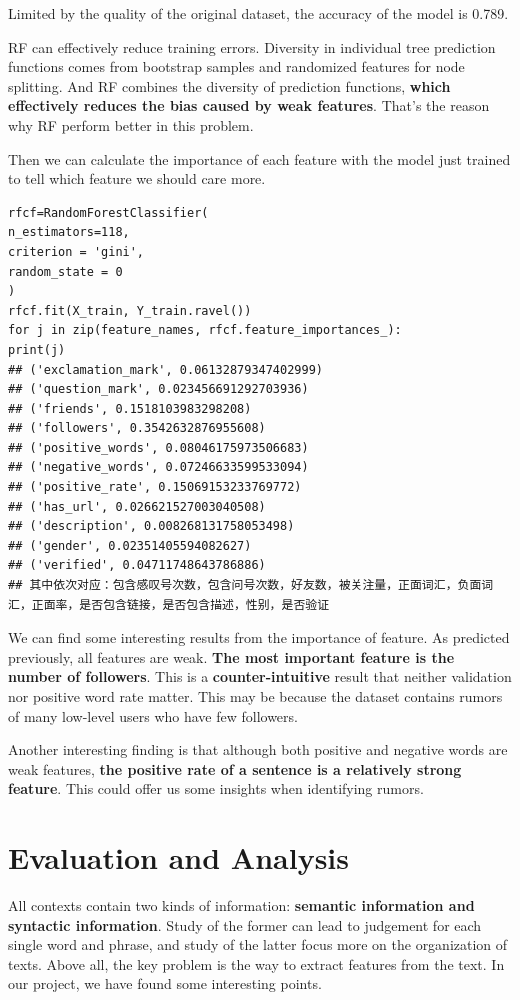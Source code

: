 \documentclass[12pt,a4paper]{article}
\begin{document}
Limited by the quality of the original dataset, the accuracy of the model is 0.789.

RF can effectively reduce training errors. Diversity in individual tree prediction functions comes from bootstrap samples and randomized features for node splitting. And RF combines the diversity of prediction functions, \textbf{which effectively reduces the bias caused by weak features}. That’s the reason why RF perform better in this problem. 

Then we can calculate the importance of each feature with the model just trained to tell which feature we should care more.

\begin{lstlisting}
rfcf=RandomForestClassifier(
n_estimators=118,
criterion = 'gini',
random_state = 0
)
rfcf.fit(X_train, Y_train.ravel())
for j in zip(feature_names, rfcf.feature_importances_):
print(j)
## ('exclamation_mark', 0.06132879347402999)
## ('question_mark', 0.023456691292703936)
## ('friends', 0.1518103983298208)
## ('followers', 0.3542632876955608)
## ('positive_words', 0.08046175973506683)
## ('negative_words', 0.07246633599533094)
## ('positive_rate', 0.15069153233769772)
## ('has_url', 0.026621527003040508)
## ('description', 0.008268131758053498)
## ('gender', 0.02351405594082627)
## ('verified', 0.04711748643786886)
## 其中依次对应：包含感叹号次数，包含问号次数，好友数，被关注量，正面词汇，负面词汇，正面率，是否包含链接，是否包含描述，性别，是否验证
\end{lstlisting}
\label{4.2}

We can find some interesting results from the importance of feature. As predicted previously, all features are weak. \textbf{The most important feature is the number of followers}. This is a \textbf{counter-intuitive} result that neither validation nor positive word rate matter. This may be because the dataset contains rumors of many low-level users who have few followers. 

Another interesting finding is that although both positive and negative words are weak features, \textbf{the positive rate of a sentence is a relatively strong feature}. This could offer us some insights when identifying rumors.

\section{Evaluation and Analysis}
All contexts contain two kinds of information: \textbf{semantic information and syntactic information}. Study of the former can lead to judgement for each single word and phrase, and study of the latter focus more on the organization of texts. Above all, the key problem is the way to extract features from the text. In our project, we have found some interesting points.
\end{document}
